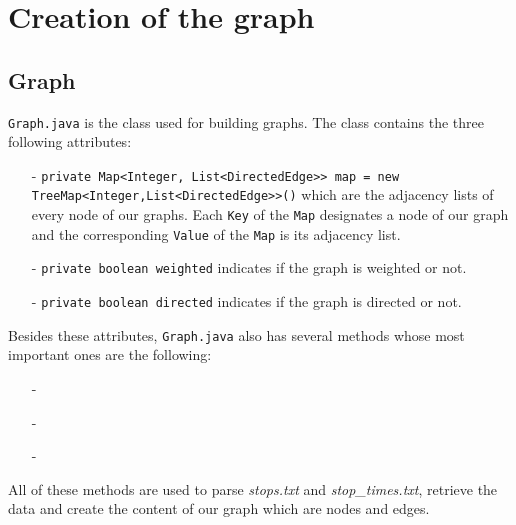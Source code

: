 \documentclass{article}
\begin{document}
\section{Creation of the graph}

\subsection{Graph}

\texttt{Graph.java} is the class used for building graphs.
The class contains the three following attributes:

\begin{itemize}
\item[-]\texttt{private Map<Integer, List<DirectedEdge>> map = new TreeMap<Integer,List<DirectedEdge>>()} which are the adjacency lists of every node of our graphs. Each \texttt{Key} of the \texttt{Map} designates a node of our graph and the corresponding \texttt{Value} of the \texttt{Map} is its adjacency list.
\item[-]\texttt{private boolean weighted} indicates if the graph is weighted or not.
\item[-]\texttt{private boolean directed} indicates if the graph is directed or not.
\end{itemize}

	Besides these attributes, \texttt{Graph.java} also has several methods whose most important ones are the following:

\begin{itemize}
\item[-]
\item[-]
\item[-]
\end{itemize}

All of these methods are used to parse \textit{stops.txt} and \textit{stop\_times.txt}, retrieve the data and create the content of our graph which are nodes and edges.
\end{document}

